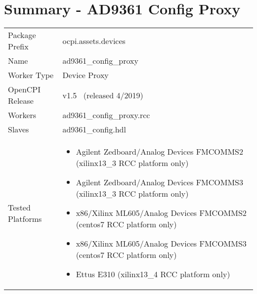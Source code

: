 \documentclass{article}
\author{} %
\date{Version \docVersion} %
\title{\docTitle}
\def\docVersion{1.5}
\def\comp{ad9361\_config\_proxy}
\def\Comp{AD9361 Config Proxy}
\begin{document}
\section*{Summary - \Comp}
\begin{longtable}{|p{}
                  |p{}|}
	\hline
	\rowcolor{blue}
	                  &                  \\
	\hline
	Package Prefix    & ocpi.assets.devices     \\
	\hline
	Name              & \comp            \\
	\hline
	Worker Type       & Device Proxy     \\
	\hline
	OpenCPI Release & v\docVersion ~ (released 4/2019) \\
	\hline
	Workers           & \comp.rcc        \\
	\hline
	Slaves            & ad9361\_config.hdl \\
	\hline
	Tested Platforms  &
\begin{itemize}
  \item Agilent Zedboard/Analog Devices FMCOMMS2 (xilinx13\_3 RCC platform only)
  \item Agilent Zedboard/Analog Devices FMCOMMS3 (xilinx13\_3 RCC platform only)
  \item x86/Xilinx ML605/Analog Devices FMCOMMS2 (centos7 RCC platform only)
  \item x86/Xilinx ML605/Analog Devices FMCOMMS3 (centos7 RCC platform only)
  \item Ettus E310 (xilinx13\_4 RCC platform only)
\end{itemize} \\

	\hline
\end{longtable}
\end{document}
